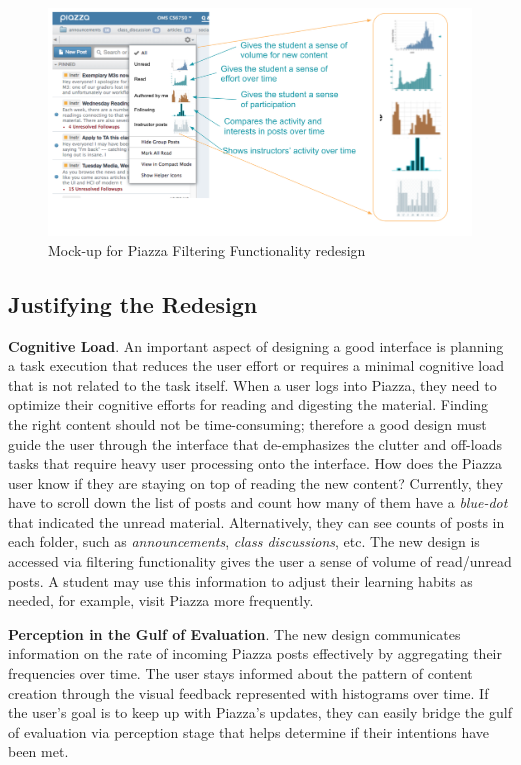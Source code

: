 \documentclass[12pt,letterpaper]{article}
\begin{document}
\begin{figure}[h]
\centering
\includegraphics[scale=.5]{figures/p5/piazza_filtering.png}
\caption{Mock-up for Piazza Filtering Functionality redesign}
\label{fig::1}
\end{figure}

\subsection*{Justifying the Redesign}

\textbf{Cognitive Load}. An important aspect of designing a good interface is planning a task execution that reduces the user effort or requires a minimal cognitive load that is not related to the task itself. When a user logs into Piazza, they need to optimize their cognitive efforts for reading and digesting the material. Finding the right content should not be time-consuming; therefore a good design must guide the user through the interface that de-emphasizes the clutter and off-loads tasks that require heavy user processing onto the interface. How does the Piazza user know if they are staying on top of reading the new content? Currently, they have to scroll down the list of posts and count how many of them have a \textit{blue-dot} that indicated the unread material. Alternatively, they can see counts of posts in each folder, such as \textit{announcements}, \textit{class discussions}, etc. The new design is accessed via filtering functionality gives the user a sense of volume of read/unread posts. A student may use this information to adjust their learning habits as needed, for example, visit Piazza more frequently.     

\textbf{Perception in the Gulf of Evaluation}. The new design communicates information on the rate of incoming Piazza posts effectively by aggregating their frequencies over time. The user stays informed about the pattern of content creation through the visual feedback represented with histograms over time. If the user's goal is to keep up with Piazza's updates, they can easily bridge the gulf of evaluation via perception stage that helps determine if their intentions have been met.
\end{document}
